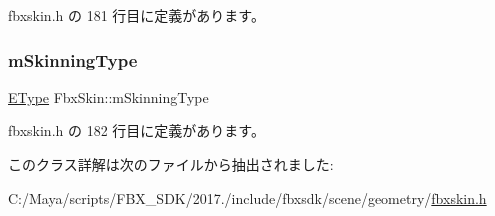  fbxskin.\+h の 181 行目に定義があります。

\mbox{\label{class_fbx_skin_a2a965fe095919b4e2c9a36ee6ca1fecd}} 
\subsubsection{\texorpdfstring{m\+Skinning\+Type}{mSkinningType}}
{\footnotesize\ttfamily \hyperlink{class_fbx_skin_aee398789ebed22fa97269a26c6049a16}{E\+Type} Fbx\+Skin\+::m\+Skinning\+Type\hspace{0.3cm}{\ttfamily [protected]}}



 fbxskin.\+h の 182 行目に定義があります。



このクラス詳解は次のファイルから抽出されました\+:\begin{DoxyCompactItemize}
\item 
C\+:/\+Maya/scripts/\+F\+B\+X\+\_\+\+S\+D\+K/2017./include/fbxsdk/scene/geometry/\hyperlink{fbxskin_8h}{fbxskin.\+h}\end{DoxyCompactItemize}
